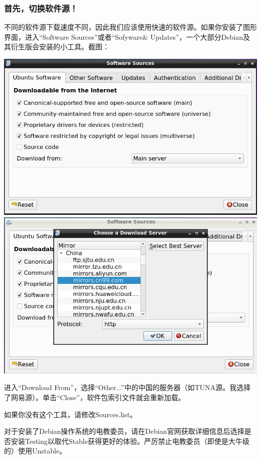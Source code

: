 \subsubsection{首先，切换软件源！}
不同的软件源下载速度不同，因此我们应该使用快速的软件源。如果你安装了图形界面，进入“Software Sources”或者“Sofyware\& Updates”，一个大部分Debian及其衍生版会安装的小工具。截图：
\begin{center}
	\includegraphics[scale=0.4]{pic/src1}	\includegraphics[scale=0.4]{pic/src2}
\end{center} \par
进入“Download From”，选择“Other...”中的中国的服务器（如TUNA源。我选择了网易源）。单击“Close”，软件包索引文件就会重新加载。\par
如果你没有这个工具，请修改Sources.list。\par
对于安装了Debian操作系统的电教委员，请在Debian官网获取详细信息后选择是否安装Testing以取代Stable获得更好的体验。严厉禁止电教委员（即使是大牛级的）使用Unstable。
